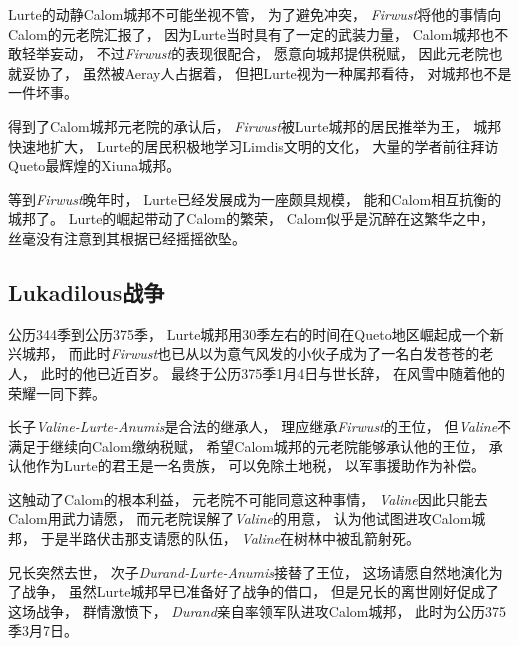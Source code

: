 \documentclass[UTF8,12pt,draft]{ctexbook}
\begin{document}
                Lurte的动静Calom城邦不可能坐视不管，
                为了避免冲突，
                \emph{Firwust}将他的事情向Calom的元老院汇报了，
                因为Lurte当时具有了一定的武装力量，
                Calom城邦也不敢轻举妄动，
                不过\emph{Firwust}的表现很配合，
                愿意向城邦提供税赋，
                因此元老院也就妥协了，
                虽然被Aeray人占据着，
                但把Lurte视为一种属邦看待，
                对城邦也不是一件坏事。

                得到了Calom城邦元老院的承认后，
                \emph{Firwust}被Lurte城邦的居民推举为王，
                城邦快速地扩大，
                Lurte的居民积极地学习Limdis文明的文化，
                大量的学者前往拜访Queto最辉煌的Xiuna城邦。

                等到\emph{Firwust}晚年时，
                Lurte已经发展成为一座颇具规模，
                能和Calom相互抗衡的城邦了。
                Lurte的崛起带动了Calom的繁荣，
                Calom似乎是沉醉在这繁华之中，
                丝毫没有注意到其根据已经摇摇欲坠。
            \subsection{Lukadilous战争}
                公历344季到公历375季，
                Lurte城邦用30季左右的时间在Queto地区崛起成一个新兴城邦，
                而此时\emph{Firwust}也已从以为意气风发的小伙子成为了一名白发苍苍的老人，
                此时的他已近百岁。
                最终于公历375季1月4日与世长辞，
                在风雪中随着他的荣耀一同下葬。

                长子\emph{Valine-Lurte-Anumis}是合法的继承人，
                理应继承\emph{Firwust}的王位，
                但\emph{Valine}不满足于继续向Calom缴纳税赋，
                希望Calom城邦的元老院能够承认他的王位，
                承认他作为Lurte的君王是一名贵族，
                可以免除土地税，
                以军事援助作为补偿。

                这触动了Calom的根本利益，
                元老院不可能同意这种事情，
                \emph{Valine}因此只能去Calom用武力请愿，
                而元老院误解了\emph{Valine}的用意，
                认为他试图进攻Calom城邦，
                于是半路伏击那支请愿的队伍，
                \emph{Valine}在树林中被乱箭射死。

                兄长突然去世，
                次子\emph{Durand-Lurte-Anumis}接替了王位，
                这场请愿自然地演化为了战争，
                虽然Lurte城邦早已准备好了战争的借口，
                但是兄长的离世刚好促成了这场战争，
                群情激愤下，
                \emph{Durand}亲自率领军队进攻Calom城邦，
                此时为公历375季3月7日。
\end{document}
